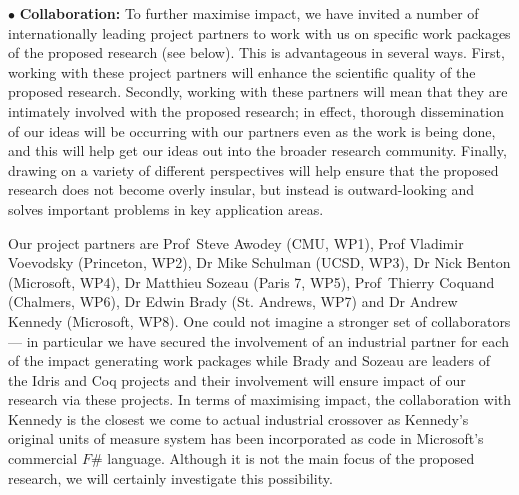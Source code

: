 \documentclass[a4paper,11pt]{article}
\begin{document}

\vspace*{0.02in}

$\bullet$ {\bf Collaboration:} To further maximise impact, we have
invited a number of internationally leading project partners to work
with us on specific work packages of the proposed research (see
below). This is advantageous in several ways. First, working
with these project partners will enhance the scientific
quality of the proposed research. Secondly, working with these
partners will mean that they are intimately involved with the proposed
research; in effect, thorough dissemination of our ideas will be
occurring with our partners even as the work is being done, and this
will help get our ideas out into the broader
research community. Finally, drawing on a variety of different
perspectives will help ensure that the proposed research does not
become overly insular, but instead is outward-looking and
solves important problems in key application areas.

Our project partners are Prof~Steve Awodey (CMU, WP1), Prof Vladimir
Voevodsky (Princeton, WP2), Dr Mike Schulman (UCSD, WP3), Dr Nick
Benton (Microsoft, WP4), Dr Matthieu Sozeau (Paris 7, WP5),
Prof~Thierry Coquand (Chalmers, WP6), Dr Edwin Brady (St. Andrews,
WP7) and Dr Andrew Kennedy (Microsoft, WP8). One could not imagine a
stronger set of collaborators --- in particular we have secured the
involvement of an industrial partner for each of the impact generating
work packages while Brady and Sozeau are leaders of the Idris and Coq
projects and their involvement will ensure impact of our research via
these projects. In terms of maximising impact, the collaboration with
Kennedy is the closest we come to actual industrial crossover as
Kennedy's original units of measure system has been incorporated as
code in Microsoft's commercial $F\#$ language. Although it is not the
main focus of the proposed research, we will certainly investigate
this possibility.

\vspace*{0.02in}
\end{document}
